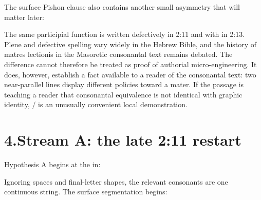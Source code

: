 The surface Pishon clause also contains another small asymmetry that will matter later:


The same participial function is written defectively in 2:11 and with  in 2:13.  Plene and defective spelling vary widely in the Hebrew Bible, and the history of matres lectionis in the Masoretic consonantal text remains debated.\cite{Elitzur2023,Hornkohl2024}  The difference cannot therefore be treated as proof of authorial micro-engineering.  It does, however, establish a fact available to a reader of the consonantal text: two near-parallel lines display different policies toward a mater.  If the passage is teaching a reader that consonantal equivalence is not identical with graphic identity, / is an unusually convenient local demonstration.

\section*{4.\quad Stream A: the late 2:11 restart}

Hypothesis A begins at the  in:


Ignoring spaces and final-letter shapes, the relevant consonants are one continuous string.  The surface segmentation begins:


